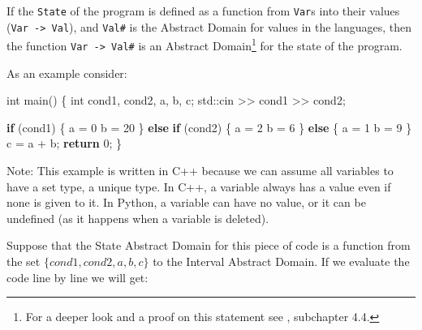 \documentclass[
11pt, %
english, %
singlespacing, %
headsepline, %
]{MastersDoctoralThesis} %
\newenvironment{Shaded}{}{}
\newcommand{\BuiltInTok}[1]{#1}
\newcommand{\ControlFlowTok}[1]{\textcolor[rgb]{0.00,0.44,0.13}{\textbf{#1}}}
\newcommand{\DataTypeTok}[1]{\textcolor[rgb]{0.56,0.13,0.00}{#1}}
\newcommand{\DecValTok}[1]{\textcolor[rgb]{0.25,0.63,0.44}{#1}}
\newcommand{\NormalTok}[1]{#1}
\begin{document}
If the \texttt{State} of the program is defined as a function from
\texttt{Var}s into their values (\texttt{Var\ -\textgreater{}\ Val}),
and \texttt{Val\#} is the Abstract Domain for values in the languages,
then the function \texttt{Var\ -\textgreater{}\ Val\#} is an Abstract
Domain\footnote{For a deeper look and a proof on this statement see
  \textcite{nielson2015principles}, subchapter 4.4.} for the state of
the program.

As an example consider:

\begin{Shaded}
\begin{Highlighting}[]
\DataTypeTok{int}\NormalTok{ main() \{}
  \DataTypeTok{int}\NormalTok{ cond1, cond2, a, b, c;}
  \BuiltInTok{std::}\NormalTok{cin >> cond1 >> cond2;}

  \ControlFlowTok{if}\NormalTok{ (cond1) \{}
\NormalTok{    a = }\DecValTok{0}
\NormalTok{    b = }\DecValTok{20}
\NormalTok{  \} }\ControlFlowTok{else} \ControlFlowTok{if}\NormalTok{ (cond2) \{}
\NormalTok{    a = }\DecValTok{2}
\NormalTok{    b = }\DecValTok{6}
\NormalTok{  \} }\ControlFlowTok{else}\NormalTok{ \{}
\NormalTok{    a = }\DecValTok{1}
\NormalTok{    b = }\DecValTok{9}
\NormalTok{  \}}
\NormalTok{  c = a + b;}
  \ControlFlowTok{return} \DecValTok{0}\NormalTok{;}
\NormalTok{\}}
\end{Highlighting}
\end{Shaded}

Note: This example is written in C++ because we can assume all variables
to have a set type, a unique type. In C++, a variable always has a value
even if none is given to it. In Python, a variable can have no value, or
it can be undefined (as it happens when a variable is deleted).

Suppose that the State Abstract Domain for this piece of code is a
function from the set \(\{cond1, cond2, a, b, c\}\) to the Interval
Abstract Domain. If we evaluate the code line by line we will get:
\end{document}
